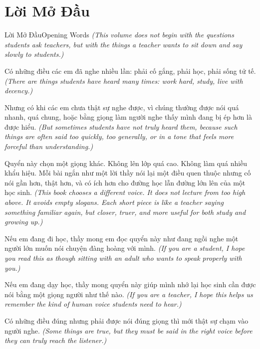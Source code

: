 \chapter*{Lời Mở Đầu}

\begin{truyen}{Lời Mở Đầu}{Opening Words}
\textit{(This volume does not begin with the questions students ask teachers, but with the things a teacher wants to sit down and say slowly to students.)}

Có những điều các em đã nghe nhiều lần: phải cố gắng, phải học, phải sống tử tế.
\textit{(There are things students have heard many times: work hard, study, live with decency.)}

Nhưng có khi các em chưa thật sự nghe được, vì chúng thường được nói quá nhanh, quá chung, hoặc bằng giọng làm người nghe thấy mình đang bị ép hơn là được hiểu.
\textit{(But sometimes students have not truly heard them, because such things are often said too quickly, too generally, or in a tone that feels more forceful than understanding.)}

Quyển này chọn một giọng khác. Không lên lớp quá cao. Không làm quá nhiều khẩu hiệu. Mỗi bài ngắn như một lời thầy nói lại một điều quen thuộc nhưng cố nói gần hơn, thật hơn, và có ích hơn cho đường học lẫn đường lớn lên của một học sinh.
\textit{(This book chooses a different voice. It does not lecture from too high above. It avoids empty slogans. Each short piece is like a teacher saying something familiar again, but closer, truer, and more useful for both study and growing up.)}

Nếu em đang đi học, thầy mong em đọc quyển này như đang ngồi nghe một người lớn muốn nói chuyện đàng hoàng với mình.
\textit{(If you are a student, I hope you read this as though sitting with an adult who wants to speak properly with you.)}

Nếu em đang dạy học, thầy mong quyển này giúp mình nhớ lại học sinh cần được nói bằng một giọng người như thế nào.
\textit{(If you are a teacher, I hope this helps us remember the kind of human voice students need to hear.)}
\end{truyen}

\begin{baihoc}
Có những điều đúng nhưng phải được nói đúng giọng thì mới thật sự chạm vào người nghe.
\textit{(Some things are true, but they must be said in the right voice before they can truly reach the listener.)}
\end{baihoc}

